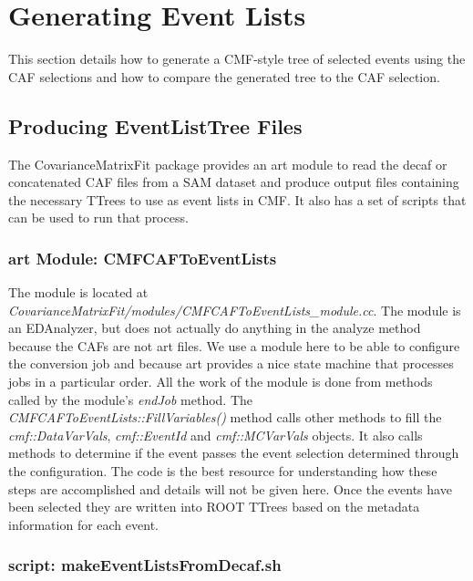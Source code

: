 \section{Generating Event Lists}

This section details how to generate a CMF-style tree of selected events using the CAF selections and how to compare the generated tree to the CAF selection.

\subsection{Producing EventListTree Files}

The CovarianceMatrixFit package provides an art module to read the decaf or concatenated CAF files from a SAM dataset and produce output files containing the necessary TTrees to use as event lists in CMF.  It also has a set of scripts that can be used to run that process.

\subsubsection{art Module: CMFCAFToEventLists}
The module is located at {\it CovarianceMatrixFit/modules/CMFCAFToEventLists\_module.cc}.  The module is an EDAnalyzer, but does not actually do anything in the analyze method because the CAFs are not art files.  We use a module here to be able to configure the conversion job and because art provides a nice state machine that processes jobs in a particular order.  All the work of the module is done from methods called by the module's {\it endJob} method.  The {\it CMFCAFToEventLists::FillVariables()} method calls other methods to fill the {\it cmf::DataVarVals}, {\it cmf::EventId} and {\it cmf::MCVarVals} objects.  It also calls methods to determine if the event passes the event selection determined through the configuration.  The code is the best resource for understanding how these steps are accomplished and details will not be given here.  Once the events have been selected they are written into ROOT TTrees based on the metadata information for each event.  

\subsubsection{script: makeEventListsFromDecaf.sh}

